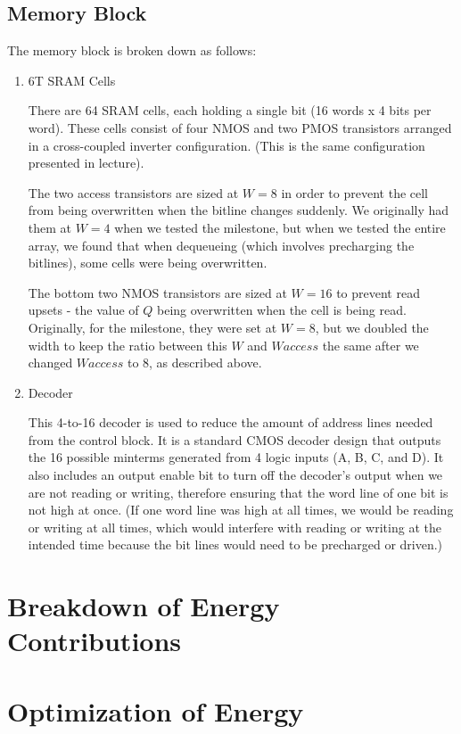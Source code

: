 \documentclass[12pt]{report}
\begin{document}
\subsection*{Memory Block}
The memory block is broken down as follows:
\begin{enumerate}
  \item 6T SRAM Cells

  There are 64 SRAM cells, each holding a single bit (16 words x 4 bits per word). These cells consist of four NMOS and two PMOS transistors arranged in a cross-coupled inverter configuration. (This is the same configuration presented in lecture).

  The two access transistors are sized at $W = 8$ in order to prevent the cell from being overwritten when the bitline changes suddenly. We originally had them at $W = 4$ when we tested the milestone, but when we tested the entire array, we found that when dequeueing (which involves precharging the bitlines), some cells were being overwritten.

  The bottom two NMOS transistors are sized at $W = 16$ to prevent read upsets - the value of $Q$ being overwritten when the cell is being read. Originally, for the milestone, they were set at $W = 8$, but we doubled the width to keep the ratio between this $W$ and $W{access}$ the same after we changed $W{access}$ to 8, as described above.

  \item Decoder

  This 4-to-16 decoder is used to reduce the amount of address lines needed from the control block. It is a standard CMOS decoder design that outputs the 16 possible minterms generated from 4 logic inputs (A, B, C, and D). It also includes an output enable bit to turn off the decoder's output when we are not reading or writing, therefore ensuring that the word line of one bit is not high at once. (If one word line was high at all times, we would be reading or writing at all times, which would interfere with reading or writing at the intended time because the bit lines would need to be precharged or driven.)
\end{enumerate}

\newpage
\section*{Breakdown of Energy Contributions}

\newpage
\section*{Optimization of Energy}
\end{document}
